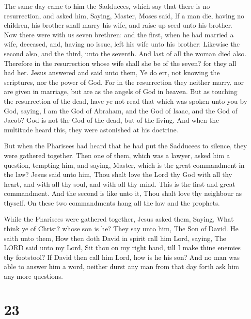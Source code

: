  The same day came to him the Sadducees, which say that
there is no resurrection, and asked him,  Saying, Master,
Moses said, If a man die, having no children, his brother shall marry
his wife, and raise up seed unto his brother.  Now there
were with us seven brethren: and the first, when he had married a wife,
deceased, and, having no issue, left his wife unto his brother:
 Likewise the second also, and the third, unto the
seventh.  And last of all the woman died also.
 Therefore in the resurrection whose wife shall she be of
the seven? for they all had her.  Jesus answered and said
unto them, Ye do err, not knowing the scriptures, nor the power of God.
 For in the resurrection they neither marry, nor are
given in marriage, but are as the angels of God in heaven.
 But as touching the resurrection of the dead, have ye
not read that which was spoken unto you by God, saying, 
I am the God of Abraham, and the God of Isaac, and the God of Jacob? God
is not the God of the dead, but of the living.  And when
the multitude heard this, they were astonished at his doctrine.

 But when the Pharisees had heard that he had put the
Sadducees to silence, they were gathered together.  Then
one of them, which was a lawyer, asked him a question, tempting him, and
saying,  Master, which is the great commandment in the
law?  Jesus said unto him, Thou shalt love the Lord thy
God with all thy heart, and with all thy soul, and with all thy mind.
 This is the first and great commandment. 
And the second is like unto it, Thou shalt love thy neighbour as
thyself.  On these two commandments hang all the law and
the prophets.

 While the Pharisees were gathered together, Jesus asked
them,  Saying, What think ye of Christ? whose son is he?
They say unto him, The Son of David.  He saith unto them,
How then doth David in spirit call him Lord, saying,  The
LORD said unto my Lord, Sit thou on my right hand, till I make thine
enemies thy footstool?  If David then call him Lord, how
is he his son?  And no man was able to answer him a word,
neither durst any man from that day forth ask him any more questions.

\hypertarget{section-22}{%
\section{23}\label{section-22}}

